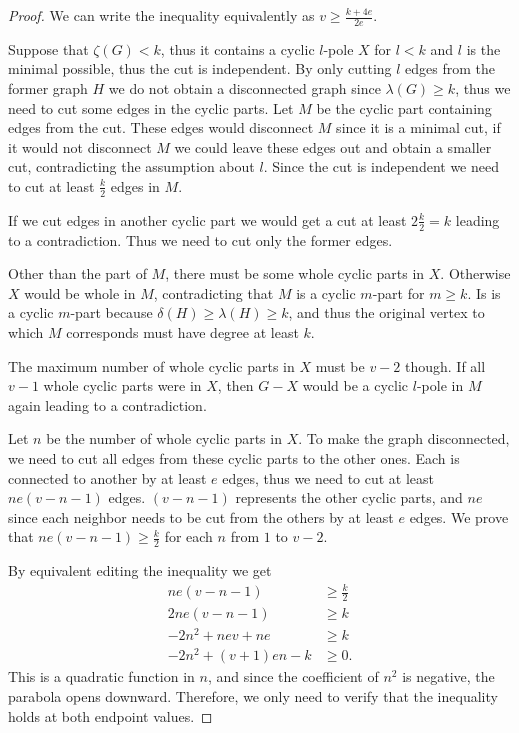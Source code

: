 \documentclass[12pt, twoside]{book}
\begin{document}
\begin{proof}
	
	We can write the inequality equivalently as $v\geq \frac{k+4e}{2e}$.
	
	Suppose that $\zeta(G)<k$, thus it contains a cyclic $l$-pole $X$ for $l<k$ and $l$ is the minimal possible, thus the cut is independent. By only cutting $l$ edges from the former graph $H$ we do not obtain a disconnected graph since $\lambda(G)\geq k$, thus we need to cut some edges in the cyclic parts. Let $M$ be the cyclic part containing edges from the cut. These edges would disconnect $M$ since it is a minimal cut, if it would not disconnect $M$ we could leave these edges out and obtain a smaller cut, contradicting the assumption about $l$. Since the cut is independent we need to cut at least $\frac{k}{2}$ edges in $M$.
	
	If we cut edges in another cyclic part we would get a cut at least $2\frac{k}{2}=k$ leading to a contradiction. Thus we need to cut only the former edges.
	
	Other than the part of $M$, there must be some whole cyclic parts in $X$. Otherwise $X$ would be whole in $M$, contradicting that $M$ is a cyclic $m$-part for $m\geq k$. Is is a cyclic $m$-part because $\delta(H)\geq \lambda(H)\geq k$, and thus the original vertex to which $M$ corresponds must have degree at least $k$.
	
	The maximum number of whole cyclic parts in $X$ must be $v-2$ though. If all $v-1$ whole cyclic parts were in $X$, then $G-X$ would be a cyclic $l$-pole in $M$ again leading to a contradiction.
	
	Let $n$ be the number of whole cyclic parts in $X$. To make the graph disconnected, we need to cut all edges from these cyclic parts to the other ones. Each is connected to another by at least $e$ edges, thus we need to cut at least $ne(v-n-1)$ edges. $(v-n-1)$ represents the other cyclic parts, and $ne$ since each neighbor needs to be cut from the others by at least $e$ edges. We prove that $ne(v-n-1)\geq\frac{k}{2}$ for each $n$ from $1$ to $v-2$.
	
	By equivalent editing the inequality we get
	\begin{align*}
		ne(v-n-1)&\geq\frac{k}{2} \\
		2ne(v-n-1)&\geq k \\
		-2n^2+nev+ne&\geq k \\
		-2n^2+(v+1)en-k&\geq 0.
	\end{align*}
	This is a quadratic function in $n$, and since the coefficient of $n^2$ is negative, the parabola opens downward. Therefore, we only need to verify that the inequality holds at both endpoint values.
	

\end{proof}
\end{document}
